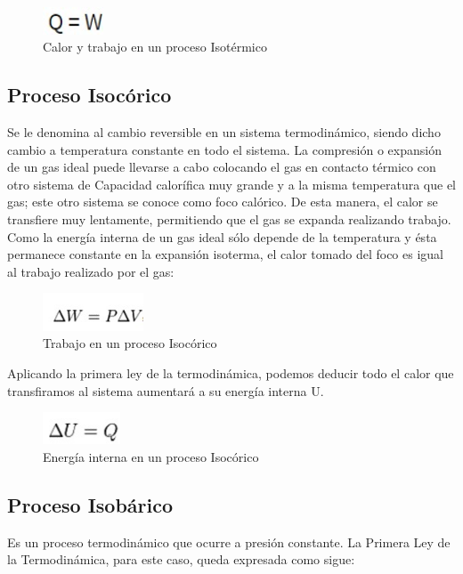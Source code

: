 \documentclass[journal,transmag]{IEEEtran}
\begin{document}
\begin{figure}[!h]
				\center
				\includegraphics[width=1.8cm]{img/5.jpeg}
				\caption{Calor y trabajo en un proceso Isotérmico}
				\label{f5}
	\end{figure}
	
\subsection{\textbf{Proceso Isocórico }}
Se le denomina al cambio reversible en un sistema termodinámico, siendo dicho cambio a temperatura constante en todo el sistema. La compresión o expansión de un gas ideal puede llevarse a cabo colocando el gas en contacto térmico con otro sistema de Capacidad calorífica muy grande y a la misma temperatura que el gas; este otro sistema se conoce como foco calórico. De esta manera, el calor se transfiere muy lentamente, permitiendo que el gas se expanda realizando trabajo. Como la energía interna de un gas ideal sólo depende de la temperatura y ésta permanece constante en la expansión isoterma, el calor tomado del foco es igual al trabajo realizado por el gas:  

\begin{figure}[!h]
				\center
				\includegraphics[width=3cm]{img/6.jpeg}
				\caption{Trabajo en un proceso Isocórico}
				\label{f6}
	\end{figure}
	
Aplicando la primera ley de la termodinámica, podemos deducir todo el calor que transfiramos al sistema aumentará a su energía interna U. 
\begin{figure}[!h]
				\center
				\includegraphics[width=2.3cm]{img/7.jpeg}
				\caption{Energía interna en un proceso Isocórico}
				\label{f7}
	\end{figure}
	
\subsection{\textbf{Proceso Isobárico}}
Es un proceso termodinámico que ocurre a presión constante. La Primera Ley de la Termodinámica, para este caso, queda expresada como sigue:  
\end{document}
